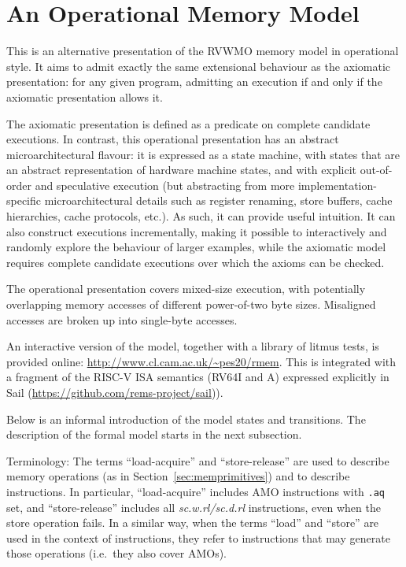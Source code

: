 \section{An Operational Memory Model}
\label{sec:operational}
This is an alternative presentation of the RVWMO memory model in
operational style.
%
It aims to admit exactly the same extensional behaviour as the
axiomatic presentation: for any given program, admitting an execution
if and only if the axiomatic presentation allows it.

The axiomatic presentation is defined as a predicate on complete
candidate executions.  In contrast, this operational presentation has
an abstract microarchitectural flavour: it is expressed as a state
machine, with states that are an abstract representation of hardware
machine states, and with explicit out-of-order and speculative
execution
(but abstracting from more implementation-specific microarchitectural
details such as register renaming, store buffers, cache hierarchies, cache protocols, etc.).
As such, it can provide useful intuition.
It can also
construct executions incrementally, making it possible to
interactively and randomly explore the behaviour of larger examples,
while the axiomatic model requires complete candidate executions
over which the axioms can be checked.

The operational presentation covers mixed-size execution, with
potentially overlapping memory accesses of different power-of-two byte
sizes.  Misaligned accesses are broken up into single-byte accesses.

An interactive version of the model, together with a library of litmus tests,
is provided online: \url{http://www.cl.cam.ac.uk/~pes20/rmem}.
This is integrated with a fragment of the RISC-V ISA semantics
(RV64I and A) expressed explicitly in Sail
(\url{https://github.com/rems-project/sail})).


Below is an informal introduction of the model states and transitions.
The description of the formal model starts in the next subsection.


Terminology: The terms ``load-acquire'' and ``store-release'' are used
to describe  memory operations (as in
Section~\ref{sec:memprimitives}) and to describe instructions.
In particular, ``load-acquire'' includes AMO instructions with {\tt .aq} set, and ``store-release'' includes all {\em sc.w.rl/sc.d.rl} instructions, even when the store operation fails.
In a similar way, when the terms ``load'' and ``store'' are used in the context of instructions, they refer to instructions that may generate those operations (i.e.~they also cover AMOs).



